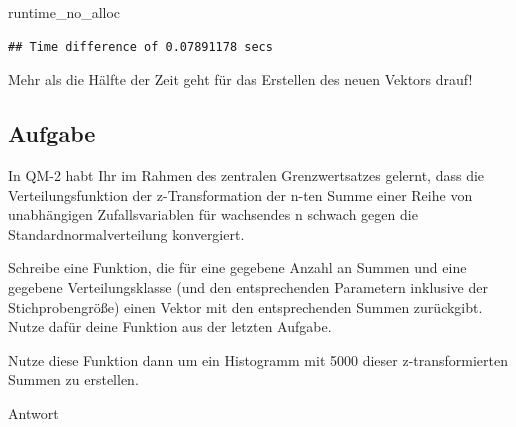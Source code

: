 \documentclass[
]{book}
\newenvironment{Shaded}{\begin{snugshade}}{\end{snugshade}}
\newcommand{\NormalTok}[1]{#1}
\begin{document}
\begin{Shaded}
\begin{Highlighting}[]
\NormalTok{runtime\_no\_alloc}
\end{Highlighting}
\end{Shaded}

\begin{verbatim}
## Time difference of 0.07891178 secs
\end{verbatim}

Mehr als die Hälfte der Zeit geht für das Erstellen des neuen Vektors drauf!

\hypertarget{aufgabe-4}{%
\subsection{Aufgabe}\label{aufgabe-4}}

In QM-2 habt Ihr im Rahmen des zentralen Grenzwertsatzes gelernt, dass die Verteilungsfunktion der z-Transformation der n-ten Summe einer Reihe von unabhängigen Zufallsvariablen für wachsendes n schwach gegen die Standardnormalverteilung konvergiert.

Schreibe eine Funktion, die für eine gegebene Anzahl an Summen und eine gegebene Verteilungsklasse (und den entsprechenden Parametern inklusive der Stichprobengröße) einen Vektor mit den entsprechenden Summen zurückgibt.
Nutze dafür deine Funktion aus der letzten Aufgabe.

Nutze diese Funktion dann um ein Histogramm mit 5000 dieser z-transformierten Summen zu erstellen.

Antwort
\end{document}

